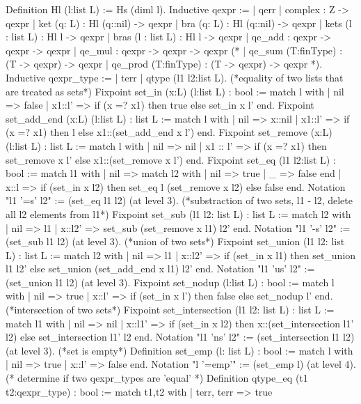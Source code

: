 \begin{coq}
Definition Hl (l:list L) := Hs (diml l).
Inductive qexpr :=
    | qerr
    | complex : Z -> qexpr
    | ket (q: L) : Hl (q::nil) -> qexpr
    | bra (q: L) : Hl (q::nil) -> qexpr
    | kets (l : list L) : Hl l -> qexpr
    | bras (l : list L) : Hl l -> qexpr
    | qe_add : qexpr -> qexpr -> qexpr
    | qe_mul : qexpr -> qexpr -> qexpr
(*     | qe_sum (T:finType) : (T -> qexpr) -> qexpr
    | qe_prod (T:finType) : (T -> qexpr) -> qexpr *).
Inductive qexpr_type := 
    | terr
    | qtype (l1 l2:list L).
(*equality of two lists that are treated as sets*)
Fixpoint set_in (x:L) (l:list L) : bool :=
  match l with
  | nil => false
  | x1::l' => if (x =? x1) then true
              else set_in x l'
  end.
Fixpoint set_add_end (x:L) (l:list L) : list L :=
  match l with
  | nil => x::nil
  | x1::l' => if (x =? x1) then l
              else x1::(set_add_end x l')
  end.
Fixpoint set_remove (x:L) (l:list L) : list L :=
  match l with
  | nil => nil
  | x1 :: l' => if (x =? x1) then set_remove x l'
                else x1::(set_remove x l')
  end.
Fixpoint set_eq (l1 l2:list L) : bool := 
  match l1 with
  | nil => match l2 with
           | nil => true
           | _ => false
           end
  | x::l => if (set_in x l2) then set_eq l (set_remove x l2)
            else false
  end.
Notation "l1 '=s' l2" := (set_eq l1 l2) (at level 3).
(*substraction of two sets, l1 - l2, delete all l2 elements from l1*)
Fixpoint set_sub (l1 l2: list L) : list L := 
  match l2 with
  | nil => l1
  | x::l2' => set_sub (set_remove x l1) l2'
  end.
Notation "l1 '-s' l2" := (set_sub l1 l2) (at level 3).
(*union of two sets*)
Fixpoint set_union (l1 l2: list L) : list L := 
  match l2 with
  | nil => l1
  | x::l2' => if (set_in x l1) then set_union l1 l2'
              else set_union (set_add_end x l1) l2'
  end.
Notation "l1 'us' l2" := (set_union l1 l2) (at level 3).
Fixpoint set_nodup (l:list L) : bool :=
  match l with
  | nil => true
  | x::l' => if (set_in x l') then false
            else set_nodup l'
  end.
(*intersection of two sets*)
Fixpoint set_intersection (l1 l2: list L) : list L := 
  match l1 with
  | nil => nil
  | x::l1' => if (set_in x l2) then x::(set_intersection l1' l2)
              else set_intersection l1' l2
  end.
Notation "l1 'ns' l2" := (set_intersection l1 l2) (at level 3).
(*set is empty*)
Definition set_emp (l: list L) : bool := 
    match l with
    | nil => true
    | x::l' => false
    end.
Notation "l '=emp'" := (set_emp l) (at level 4).
(* determine if two qexpr_types are 'equal' *)
Definition qtype_eq (t1 t2:qexpr_type) : bool :=
    match t1,t2 with
    | terr, terr => true

\end{coq}
